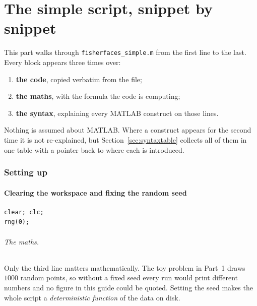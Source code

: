 
\part{The simple script, snippet by snippet}
\label{part:simple}

This part walks through \texttt{fisherfaces\_simple.m} from the first line to
the last. Every block appears three times over:

\begin{enumerate}[nosep]
\item \textbf{the code}, copied verbatim from the file;
\item \textbf{the maths}, with the formula the code is computing;
\item \textbf{the syntax}, explaining every MATLAB construct on those lines.
\end{enumerate}

Nothing is assumed about MATLAB. Where a construct appears for the second time
it is not re-explained, but Section~\ref{sec:syntaxtable} collects all of them
in one table with a pointer back to where each is introduced.

\section{Setting up}

\subsection{Clearing the workspace and fixing the random seed}

\begin{lstlisting}
clear; clc;
rng(0);
\end{lstlisting}

\paragraph{The maths.} Only the third line matters mathematically. The toy
problem in Part~1 draws $1000$ random points, so without a fixed seed every run
would print different numbers and no figure in this guide could be quoted.
Setting the seed makes the whole script a \emph{deterministic function} of the
data on disk.

